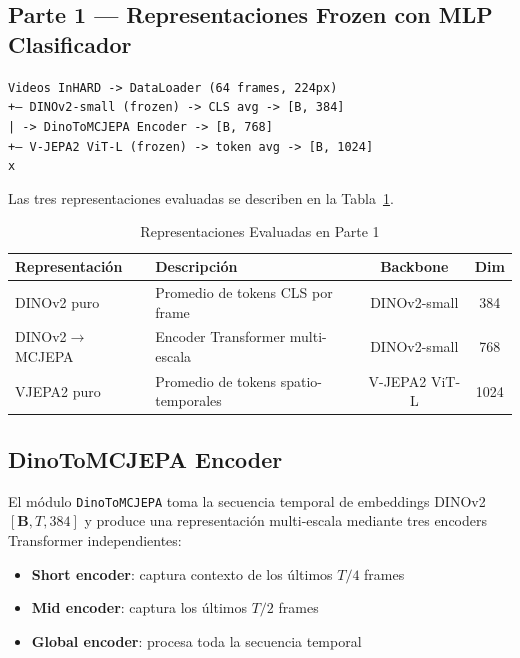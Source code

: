 \documentclass[11pt,letterpaper]{article}
\begin{document}
\subsection{Parte 1 — Representaciones Frozen con MLP Clasificador}

\begin{tcolorbox}[colback=lightGray, colframe=darkGray, title=Pipeline Parte 1]
\small
\texttt{Videos InHARD -> DataLoader (64 frames, 224px)} \\[0.3em]
\texttt{\quad +-- DINOv2-small (frozen) -> CLS avg -> [B, 384]} \\
\texttt{\quad |               -> DinoToMCJEPA Encoder -> [B, 768]} \\
\texttt{\quad +-- V-JEPA2 ViT-L (frozen) -> token avg -> [B, 1024]} \\[0.3em]
\texttt{\quad{} x} \\
\texttt{\quad{}}
\end{tcolorbox}

\noindent Las tres representaciones evaluadas se describen en la Tabla~\ref{tab:reps}.

\begin{table}[H]
\centering
\caption{Representaciones Evaluadas en Parte 1}
\label{tab:reps}
\begin{tabular}{llcc}
\toprule
\textbf{Representación} & \textbf{Descripción} & \textbf{Backbone} & \textbf{Dim} \\
\midrule
DINOv2 puro & Promedio de tokens CLS por frame & DINOv2-small & 384 \\
DINOv2$\to$MCJEPA & Encoder Transformer multi-escala & DINOv2-small & 768 \\
VJEPA2 puro & Promedio de tokens spatio-temporales & V-JEPA2 ViT-L & 1024 \\
\bottomrule
\end{tabular}
\end{table}

\subsection{DinoToMCJEPA Encoder}

El módulo \texttt{DinoToMCJEPA} toma la secuencia temporal de embeddings DINOv2 $[\mathbf{B}, T, 384]$ y produce una representación multi-escala mediante tres encoders Transformer independientes:

\begin{itemize}[leftmargin=1.5em]
  \item \textbf{Short encoder}: captura contexto de los últimos $T/4$ frames
  \item \textbf{Mid encoder}: captura los últimos $T/2$ frames
  \item \textbf{Global encoder}: procesa toda la secuencia temporal
\end{itemize}
\end{document}
